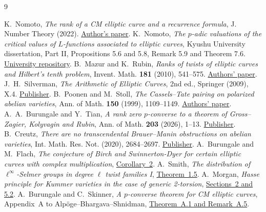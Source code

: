\documentclass[11pt]{article}
\begin{document}
\begin{thebibliography}{9}\raggedright
{} K.~Nomoto, \emph{The rank of a CM elliptic curve and a recurrence formula}, J. Number Theory (2022). \href{https://arxiv.org/abs/2103.08947}{Author's paper}.
 K.~Nomoto, \emph{The $p$-adic valuations of the critical values of $L$-functions associated to elliptic curves}, Kyushu University dissertation, Part II, Propositions 5.6 and 5.8, Remark 5.9 and Theorem 7.6. \href{https://catalog.lib.kyushu-u.ac.jp/opac_download_md/6787428/math0277.pdf}{University repository}.
 B.~Mazur and K.~Rubin, \emph{Ranks of twists of elliptic curves and Hilbert's tenth problem}, Invent. Math. \textbf{181} (2010), 541--575. \href{https://arxiv.org/abs/0904.3709}{Authors' paper}.
 J.~H.~Silverman, \emph{The Arithmetic of Elliptic Curves}, 2nd ed., Springer (2009), X.4. \href{https://doi.org/10.1007/978-0-387-09494-6}{Publisher}.
 B.~Poonen and M.~Stoll, \emph{The Cassels--Tate pairing on polarized abelian varieties}, Ann. of Math. \textbf{150} (1999), 1109--1149. \href{https://math.mit.edu/~poonen/papers/sha.pdf}{Authors' paper}.
 A.~A.~Burungale and Y.~Tian, \emph{A rank zero $p$-converse to a theorem of Gross--Zagier, Kolyvagin and Rubin}, Ann. of Math. \textbf{203} (2026), 1--13. \href{https://doi.org/10.4007/annals.2026.203.1.1}{Publisher}.
 B.~Creutz, \emph{There are no transcendental Brauer--Manin obstructions on abelian varieties}, Int. Math. Res. Not. (2020), 2684--2697. \href{https://doi.org/10.1093/imrn/rny098}{Publisher}.
 A.~Burungale and M.~Flach,
\emph{The conjecture of Birch and Swinnerton-Dyer for certain elliptic
curves with complex multiplication}, \href{https://arxiv.org/abs/2206.09874}{Corollary~2}.
 A.~Smith, \emph{The distribution of $\ell^\infty$-Selmer
groups in degree $\ell$ twist families I},
\href{https://arxiv.org/abs/2207.05674}{Theorem~1.5}.
 A.~Morgan, \emph{Hasse principle for Kummer varieties
in the case of generic 2-torsion},
\href{https://doi.org/10.1112/plms.70066}{Sections~2 and 5.2}.
 A.~Burungale and C.~Skinner,
\emph{A $p$-converse theorem for CM elliptic curves}, Appendix~A to
Alp\"oge--Bhargava--Shnidman, \href{https://people.math.harvard.edu/~alpoge/papers/integers%20expressible%20as%20the%20sum%20of%20two%20rational%20cubes.pdf}{Theorem~A.1 and Remark~A.5}.
\end{thebibliography}
\end{document}
